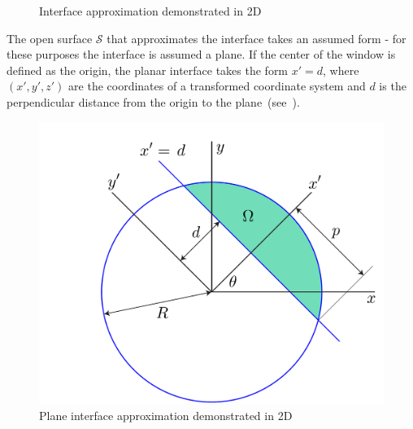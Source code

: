 \begin{figure}[ht]
{\label{fig:subfigure6}}

\caption{Interface approximation demonstrated in 2D}
\label{fig:figure3}
\end{figure}

The open surface $\mathcal{S}$ that approximates the interface takes an assumed form - for these purposes the interface is assumed a plane. If the center of the window is defined as the origin, the planar interface takes the form $x' = d$, where $(x',y',z')$ are the coordinates of a transformed coordinate system and $d$ is the perpendicular distance from the origin to the plane~(see~).

\begin{figure}[ht!]
	\centering
		\includegraphics[scale=0.3]{media/om/window.pdf}
	\caption{Plane interface approximation demonstrated in 2D}
	\label{fig:quad}
\end{figure}

